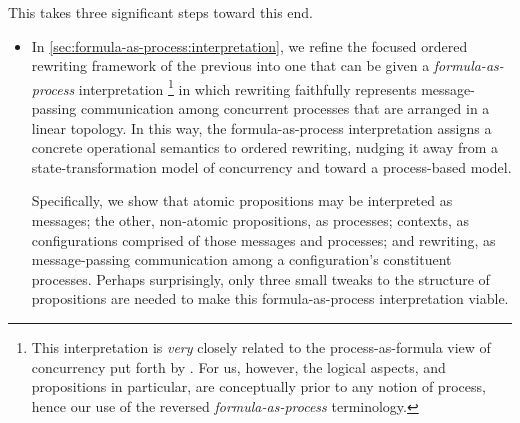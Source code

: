 This  takes three significant steps toward this end.
\begin{itemize}[listparindent=\parindent, itemsep=\dimexpr\itemsep+\parsep\relax, parsep=0pt]
\item
  In \cref{sec:formula-as-process:interpretation}, we refine the focused ordered rewriting framework of the previous  into one that can be given a \emph{formula-as-process} interpretation%
  \footnote{This interpretation is \emph{very} closely related to the process-as-formula view of concurrency put forth by \textcites{Miller:??}{Cervesato+Scedrov:IC09}.
    For us, however, the logical aspects, and propositions in particular, are conceptually prior to any notion of process, hence our use of the reversed \emph{formula-as-process} terminology.}
  in which rewriting faithfully represents message-passing communication among concurrent processes that are arranged in a linear topology.
  In this way, the formula-as-process interpretation assigns a concrete operational semantics to ordered rewriting, nudging it away from a state-transformation model of concurrency and toward a process-based model.

  Specifically, we show that atomic propositions may be interpreted as messages;
  the other, non-atomic propositions, as processes;
  contexts, as configurations comprised of those messages and processes;
  and
  rewriting, as mes\-sage-passing communication among a configuration's con\-stit\-u\-ent processes.
  Perhaps surprisingly, only three small tweaks to the structure of propositions are needed to make this formula-as-process interpretation viable.





\end{itemize}
